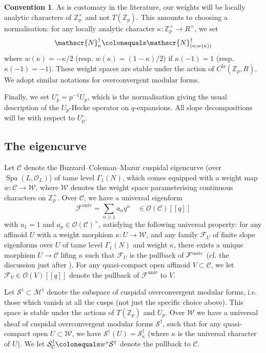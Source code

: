 \documentclass[10pt, oneside]{amsart}
\newcommand{\defeq}{\colonequals}
\numberwithin{equation}{subsection}
\theoremstyle{definition}
\newtheorem{convention}[equation]{Convention}
\theoremstyle{remark}
\newcommand{\mbb}[1]{\mathbb{#1}}
\newcommand{\opn}[1]{\operatorname{#1}}
\begin{document}
\begin{convention}
As is customary in the literature, our weights will be locally analytic characters of $\mbb{Z}_p^{\times}$ and not $T(\mbb{Z}_p)$. This amounts to choosing a normalisation: for any locally analytic character $\kappa \colon \mbb{Z}_p^{\times} \to R^{\times}$, we set
\[
\mathscr{N}^{\dagger}_{\kappa} \defeq \mathscr{N}^{\dagger}_{(\kappa; w(\kappa))}
\]
where $w(\kappa) = -\kappa/2$ (resp. $w(\kappa) = (1-\kappa)/2$) if $\kappa(-1) = 1$ (resp. $\kappa(-1) = -1$). These weight spaces are stable under the action of $C^{\opn{la}}(\mbb{Z}_p, R)$. We adopt similar notations for overconvergent modular forms. 

Finally, we set $U_p^{\circ} = p^{-1}U_p$, which is the normalisation giving the usual description of the $U_p$-Hecke operator on $q$-expansions. All slope decompositions will be with respect to $U_p^{\circ}$.
\end{convention}

\subsection{The eigencurve}

Let $\mathcal{C}$ denote the Buzzard--Coleman--Mazur cuspidal eigencurve (over $\opn{Spa}(L, \mathcal{O}_L)$) of tame level $\Gamma_1(N)$, which comes equipped with a weight map $w \colon \mathcal{C} \to \mathcal{W}$, where $\mathcal{W}$ denotes the weight space parameterising continuous characters on $\mbb{Z}_p^{\times}$. Over $\mathcal{C}$, we have a universal eigenform
\[
\mathcal{F}^{\opn{univ}} = \sum_{n \geq 1} a_n q^n \quad \in \mathcal{O}(\mathcal{C})[\![q]\!]
\]
with $a_1 = 1$ and $a_p \in \mathcal{O}(\mathcal{C})^{\times}$, satisfying the following universal property: for any affinoid $U$ with a weight morphism $\kappa : U \to \mathcal{W}$, and any family $\mathcal{F}_U$ of finite slope eigenforms over $U$ of tame level $\Gamma_1(N)$ and weight $\kappa$, there exists a unique morphism $U \to \mathcal{C}$ lifing $\kappa$ such that $\mathcal{F}_U$ is the pullback of $\mathcal{F}^{\rm univ}$ (cf. the discussion just after \cite[Definition 3.5]{LoefflerRSNote}). For any quasi-compact open affinoid $V \subset \mathcal{C}$, we let $\mathcal{F}_V \in \mathcal{O}(V)[\![q]\!]$ denote the pullback of $\mathcal{F}^{\opn{univ}}$ to $V$. 

Let $\mathscr{S}^{\dagger} \subset \mathscr{M}^{\dagger}$ denote the subspace of cuspidal overconvergent modular forms, i.e. those which vanish at all the cusps (not just the specific choice above). This space is stable under the actions of $T(\mbb{Z}_p)$ and $U_p$. Over $\mathcal{W}$ we have a universal sheaf of cuspidal overconvergent modular forms $\mathcal{S}^{\dagger}$, such that for any quasi-compact open $U \subset \mathcal{W}$, we have $\mathcal{S}^{\dagger}(U) = \mathscr{S}^{\dagger}_{\kappa}$ (where $\kappa$ is the universal character of $U$). We let $\mathcal{S}^{\dagger}_{\mathcal{C}} \defeq w^*\mathcal{S}^{\dagger}$ denote the pullback to $\mathcal{C}$. 
\end{document}
